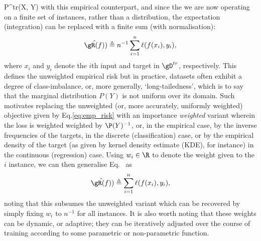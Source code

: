 P^{tr}(X, Y) \) with this empirical counterpart, and since the we are now operating on a finite set
of instances, rather than a distribution, the expectation (integration) can be replaced with a
finite sum (with normalisation):
%
\equ\begin{equation*} \label{eq:emp_risk}
  \hat{\gR(f)}) \triangleq n^{-1} \sum_{i=1}^n \ell (f(x_i), y_i),
\end{equation*}
%
where \(x_i\) and \(y_i\) denote the \(i\)th input and target in \( \gD^{tr} \), respectively.
%
This defines the unweighted empirical risk but in practice, datasets often exhibit a degree of
class-imbalance, or, more generally, `long-tailedness', which is to say that the marginal
distribution \( P(Y) \) is not uniform over its domain.
%
Such motivates replacing the unweighted (or, more accurately, uniformly weighted) objective given
by Eq.\ref{eq:emp_risk} with an importance  \emph{weighted} variant wherein the loss is weighted
weighted by \( \P(Y)^{-1} \), or, in the empirical case, by the inverse frequencies of the targets,
in the discrete (classification) case, or by the empirical density of the target (as given by
kernel density estimate (KDE), for instance) in the continuous (regression) case.
%
Using \( w_i \in \R \) to denote the weight given to the \(i\) instance, we can then generalise
Eq.~\cite{eq:emp_risk} as
%
\equ\begin{equation*} \label{eq:emp_risk_weighted}
  \hat{\gR(f)}) \triangleq \sum_{i=1}^n \ell (f(x_i), y_i),
\end{equation*}
%
noting that this subsumes the unweighted variant which can be recovered by simply fixing \(w_i\) to
\(n^{-1}\) for all instances.
%
It is also worth noting that these weights can be dynamic, or adaptive; they can be iteratively
adjusted over the course of training according to some parametric or non-parametric function.


